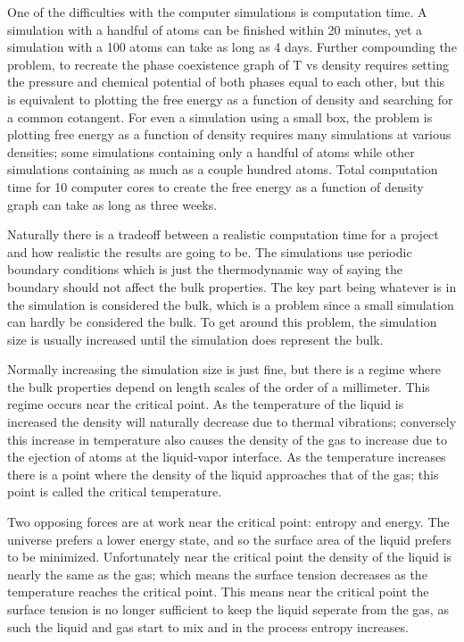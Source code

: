 One of the difficulties with the computer simulations is computation time. A simulation with a handful of atoms can be finished within 20 minutes, yet a simulation with a 100 atoms can take as long as 4 days. Further compounding the problem, to recreate the phase coexistence graph of T vs density requires setting the pressure and chemical potential of both phases equal to each other, but this is equivalent to plotting the free energy as a function of density and searching for a common cotangent. For even a simulation using a small box, the problem is plotting free energy as a function of density requires many simulations at various densities; some simulations containing only a handful of atoms while other simulations containing as much as a couple hundred atoms. Total computation time for 10 computer cores to create the free energy as a function of density graph can take as long as three weeks.

Naturally there is a tradeoff between a realistic computation time for a project and how realistic the results are going to be. The simulations use periodic boundary conditions which is just the thermodynamic way of saying the boundary should not affect the bulk properties. The key part being whatever is in the simulation is considered the bulk, which is a problem since a small simulation can hardly be considered the bulk. To get around this problem, the simulation size is usually increased until the simulation does represent the bulk. 

Normally increasing the simulation size is just fine, but there is a regime where the bulk properties depend on length scales of the order of a millimeter. This regime occurs near the critical point. As the temperature of the liquid is increased the density will naturally decrease due to thermal vibrations; conversely this increase in temperature also causes the density of the gas to increase due to the ejection of atoms at the liquid-vapor interface. As the temperature increases there is a point where the density of the liquid approaches that of the gas; this point is called the critical temperature.

Two opposing forces are at work near the critical point: entropy and energy. The universe prefers a lower energy state, and so the surface area of the liquid prefers to be minimized. Unfortunately near the critical point the density of the liquid is nearly the same as the gas; which means the surface tension decreases as the temperature reaches the critical point. This means near the critical point the surface tension is no longer sufficient to keep the liquid seperate from the gas, as such the liquid and gas start to mix and in the process entropy increases. 


